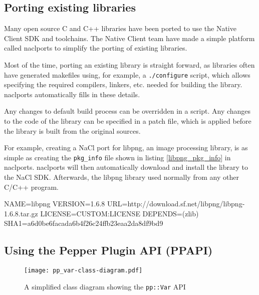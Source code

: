 
\subsection{Porting existing libraries} %
\label{sub:naclports}
Many open source C and C++ libraries have been ported to use the Native Client SDK and toolchains. The Native Client team have made a simple platform called naclports to simplify the porting of existing libraries. 

Most of the time, porting an existing library is straight forward, as libraries often have generated makefiles using, for example, a \lstinline+./configure+ script, which allows specifying the required compilers, linkers, etc. needed for building the library. naclports automatically fills in these details. 

Any changes to default build process can be overridden in a script. Any changes to the code of the library can be specified in a patch file, which is applied before the library is built from the original sources.

For example, creating a NaCl port for libpng, an image processing library, is as simple as creating the \lstinline+pkg_info+ file shown in listing \ref{libpng_pkg_info} in naclports. naclports will then automatically download and install the library to the NaCl SDK. Afterwards, the libpng library used normally from any other C/C++ program.

\begin{code}
NAME=libpng
VERSION=1.6.8
URL=http://download.sf.net/libpng/libpng-1.6.8.tar.gz
LICENSE=CUSTOM:LICENSE
DEPENDS=(zlib)
SHA1=a6d0be6facada6b4f26c24ffb23eaa2da8df9bd9
\end{code}


\subsection{Using the Pepper Plugin API (PPAPI)} %
\label{sub:using_PPAPI}
\begin{figure}
    \centering
    \texttt{[image: pp\_var-class-diagram.pdf]} 
    \caption{A simplified class diagram showing the \lstinline{pp::Var} API}
    \label{fig:pp_var_api}
\end{figure}

